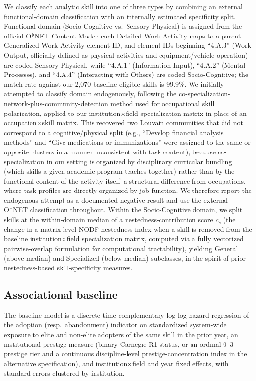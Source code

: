 \documentclass[11pt, letterpaper]{article}
\begin{document}
We classify each analytic skill into one of three types by combining an external functional-domain classification with an internally estimated specificity split. Functional domain (Socio-Cognitive vs.\ Sensory-Physical) is assigned from the official O*NET Content Model: each Detailed Work Activity maps to a parent Generalized Work Activity element ID, and element IDs beginning ``4.A.3'' (Work Output, officially defined as physical activities and equipment/vehicle operation) are coded Sensory-Physical, while ``4.A.1'' (Information Input), ``4.A.2'' (Mental Processes), and ``4.A.4'' (Interacting with Others) are coded Socio-Cognitive; the match rate against our 2,070 baseline-eligible skills is 99.9\%. We initially attempted to classify domain endogenously, following the co-specialization-network-plus-community-detection method used for occupational skill polarization, applied to our institution$\times$field specialization matrix in place of an occupation$\times$skill matrix. This recovered two Louvain communities that did not correspond to a cognitive/physical split (e.g., ``Develop financial analysis methods'' and ``Give medications or immunizations'' were assigned to the same or opposite clusters in a manner inconsistent with task content), because co-specialization in our setting is organized by disciplinary curricular bundling (which skills a given academic program teaches together) rather than by the functional content of the activity itself--a structural difference from occupations, where task profiles are directly organized by job function. We therefore report the endogenous attempt as a documented negative result and use the external O*NET classification throughout. Within the Socio-Cognitive domain, we split skills at the within-domain median of a nestedness-contribution score $c_s$ (the change in a matrix-level NODF nestedness index when a skill is removed from the baseline institution$\times$field specialization matrix, computed via a fully vectorized pairwise-overlap formulation for computational tractability), yielding General (above median) and Specialized (below median) subclasses, in the spirit of prior nestedness-based skill-specificity measures.

\subsection*{Associational baseline}

The baseline model is a discrete-time complementary log-log hazard regression of the adoption (resp.\ abandonment) indicator on standardized system-wide exposure to elite and non-elite adopters of the same skill in the prior year, an institutional prestige measure (binary Carnegie R1 status, or an ordinal 0--3 prestige tier and a continuous discipline-level prestige-concentration index in the alternative specification), and institution$\times$field and year fixed effects, with standard errors clustered by institution.
\end{document}

